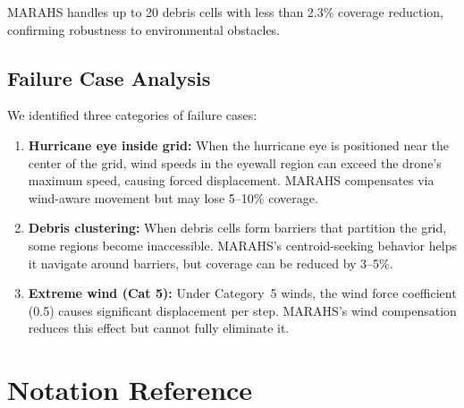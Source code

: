 \documentclass[12pt,a4paper,twocolumn]{article}
\begin{document}
\begin{enumerate}[leftmargin=*]
MARAHS handles up to 20 debris cells with less than 2.3\% coverage reduction, confirming robustness to environmental obstacles.

\subsection{Failure Case Analysis}

We identified three categories of failure cases:

\begin{enumerate}[leftmargin=*]
    \item \textbf{Hurricane eye inside grid:} When the hurricane eye is positioned near the center of the grid, wind speeds in the eyewall region can exceed the drone's maximum speed, causing forced displacement. MARAHS compensates via wind-aware movement but may lose 5--10\% coverage.

    \item \textbf{Debris clustering:} When debris cells form barriers that partition the grid, some regions become inaccessible. MARAHS's centroid-seeking behavior helps it navigate around barriers, but coverage can be reduced by 3--5\%.

    \item \textbf{Extreme wind (Cat 5):} Under Category~5 winds, the wind force coefficient (0.5) causes significant displacement per step. MARAHS's wind compensation reduces this effect but cannot fully eliminate it.
\end{enumerate}

\section{Notation Reference}
\label{app:notation}


\end{enumerate}
\end{document}
